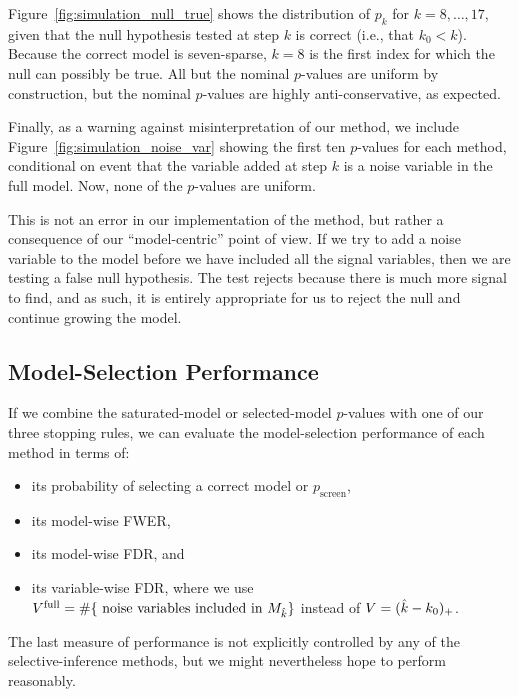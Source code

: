 \documentclass{article}
\begin{document}
Figure~\ref{fig:simulation_null_true} shows the distribution of $p_k$ for $k = 8, \ldots, 17$, given that the null hypothesis tested at step $k$ is correct (i.e., that $k_0< k$). Because the correct model is seven-sparse, $k=8$ is the first index for which the null can possibly be true. All but the nominal $p$-values are uniform by construction, but the nominal $p$-values are highly anti-conservative, as expected.

Finally, as a warning against misinterpretation of our method, we include Figure~\ref{fig:simulation_noise_var} showing the first ten $p$-values for each method, conditional on event that the variable added at step $k$ is a noise variable in the full model. Now, none of the $p$-values are uniform. 

This is not an error in our implementation of the method, but rather a consequence of our ``model-centric'' point of view. If we try to add a noise variable to the model before we have included all the signal variables, then we are testing a false null hypothesis. The test rejects because there is much more signal to find, and as such, it is entirely appropriate for us to reject the null and continue growing the model.

\subsection{Model-Selection Performance}

If we combine the saturated-model or selected-model $p$-values with one of our three stopping rules, we can evaluate the model-selection performance of each method in terms of:
\begin{itemize}
\item its probability of selecting a correct model or $p_{\text{screen}}$,
\item its model-wise FWER,
\item its model-wise FDR, and
\item its variable-wise FDR, where we use $V^{\text{full}}= \#\{\text{ noise variables included in } M_{\hat{k}}\}$ instead of $V=(\hat{k}-k_0)_+$.
\end{itemize} 
The last measure of performance is not explicitly controlled by any of the selective-inference methods, but we might nevertheless hope to perform reasonably.
\end{document}
